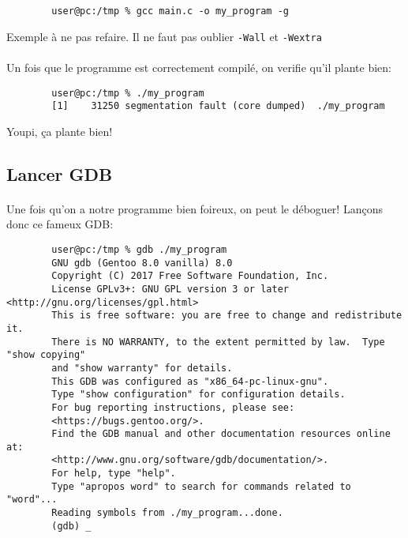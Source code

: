 \begin{listing}[H]
	\begin{verbatim}
		user@pc:/tmp % gcc main.c -o my_program -g
	\end{verbatim}
	\caption{Exemple à ne pas refaire. Il ne faut pas oublier
		\texttt{-Wall} et \texttt{-Wextra}}
\end{listing}

\paragraph{} Un fois que le programme est correctement compilé, on verifie
qu'il plante bien:

\begin{listing}[H]
	\begin{verbatim}
		user@pc:/tmp % ./my_program
		[1]    31250 segmentation fault (core dumped)  ./my_program
	\end{verbatim}
	\caption{Youpi, ça plante bien!}
\end{listing}

\subsection{Lancer GDB}

\paragraph{} Une fois qu'on a notre programme bien foireux, on peut le
déboguer! Lançons donc ce fameux GDB:

\begin{listing}[H]
	\begin{verbatim}
		user@pc:/tmp % gdb ./my_program
		GNU gdb (Gentoo 8.0 vanilla) 8.0
		Copyright (C) 2017 Free Software Foundation, Inc.
		License GPLv3+: GNU GPL version 3 or later <http://gnu.org/licenses/gpl.html>
		This is free software: you are free to change and redistribute it.
		There is NO WARRANTY, to the extent permitted by law.  Type "show copying"
		and "show warranty" for details.
		This GDB was configured as "x86_64-pc-linux-gnu".
		Type "show configuration" for configuration details.
		For bug reporting instructions, please see:
		<https://bugs.gentoo.org/>.
		Find the GDB manual and other documentation resources online at:
		<http://www.gnu.org/software/gdb/documentation/>.
		For help, type "help".
		Type "apropos word" to search for commands related to "word"...
		Reading symbols from ./my_program...done.
		(gdb) _
	\end{verbatim}
\end{listing}

